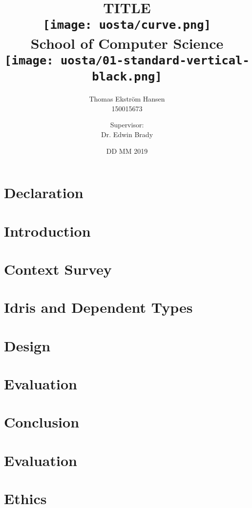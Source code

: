 \documentclass[12pt]{report}
\title{
    {TITLE}\\
    \vspace{2cm}
    {\texttt{[image: uosta/curve.png]}}\\
    {\fontfamily{ppl}\selectfont\large School of Computer Science}\\
    \vspace{-0.8cm}
    {\texttt{[image: uosta/01-standard-vertical-black.png]}}\\
    \vspace{-2cm}
}
\author{
    {Thomas Ekstr{\" o}m Hansen}\\
    {150015673}
    \and
    {Supervisor:}\\
    {Dr. Edwin Brady}
}
\date{DD MM 2019}
\begin{document}
    \maketitle
    
    \chapter*{Declaration}
    
    
    \tableofcontents
    
    \chapter{Introduction}
    
    
    \chapter{Context Survey}
    
    
    \chapter{Idris and Dependent Types}
    
        
    \chapter{Design}
    
    
    \chapter{Evaluation}
    
        
    \chapter{Conclusion}
    
    
    
    
    
    \appendix
    
    \chapter{Evaluation}\label{app:evaln}
    
    
    \chapter{Ethics}
    
\end{document}
